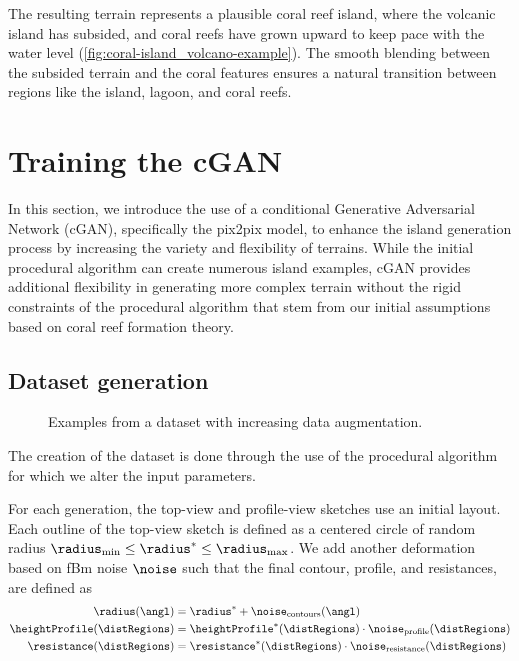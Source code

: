 \documentclass{egpubl}
\begin{document}
The resulting terrain represents a plausible coral reef island, where the volcanic island has subsided, and coral reefs have grown upward to keep pace with the water level (\cref{fig:coral-island_volcano-example}). The smooth blending between the subsided terrain and the coral features ensures a natural transition between regions like the island, lagoon, and coral reefs.




\section{Training the cGAN}

In this section, we introduce the use of a conditional Generative Adversarial Network (cGAN), specifically the pix2pix model, to enhance the island generation process by increasing the variety and flexibility of terrains. While the initial procedural algorithm can create numerous island examples, cGAN provides additional flexibility in generating more complex terrain without the rigid constraints of the procedural algorithm that stem from our initial assumptions based on coral reef formation theory.

\subsection{Dataset generation}
\label{sec:coral-island_dataset-generation}


\begin{figure}
	\centering
    \caption{Examples from a dataset with increasing data augmentation.}
    \label{fig:coral-island_cGAN-examples}
\end{figure}


The creation of the dataset is done through the use of the procedural algorithm for which we alter the input parameters. 

For each generation, the top-view and profile-view sketches use an initial layout. Each outline of the top-view sketch is defined as a centered circle of random radius $\radius_\text{min} \leq \radius^* \leq \radius_\text{max}$. We add another deformation based on fBm noise $\noise$ such that the final contour, profile, and resistances, are defined as 
\begin{align}
    \radius(\angl) &= \radius^* + \noise_{\text{contours}}(\angl) \nonumber \\
    \heightProfile(\distRegions) &= \heightProfile^*(\distRegions) \cdot \noise_{\text{profile}}(\distRegions) \nonumber \\
    \resistance(\distRegions) &= \resistance^*(\distRegions) \cdot \noise_{\text{resistance}}(\distRegions) \nonumber
\end{align}
\end{document}
